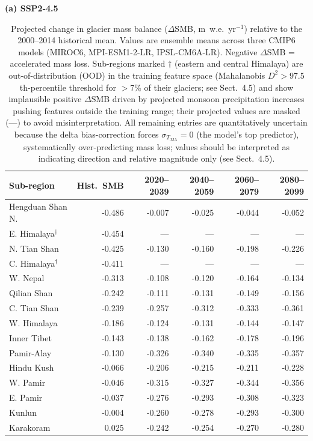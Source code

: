 \begin{table}[htbp]
\centering
\caption{Projected change in glacier mass balance ($\Delta$SMB, m~w.e.~yr$^{-1}$) relative to the 2000--2014 historical mean. Values are ensemble means across three CMIP6 models (MIROC6, MPI-ESM1-2-LR, IPSL-CM6A-LR). Negative $\Delta$SMB = accelerated mass loss. Sub-regions marked $\dagger$ (eastern and central Himalaya) are out-of-distribution (OOD) in the training feature space (Mahalanobis $D^2 > 97.5$th-percentile threshold for $>7$\% of their glaciers; see Sect.~4.5) and show implausible positive $\Delta$SMB driven by projected monsoon precipitation increases pushing features outside the training range; their projected values are masked (---) to avoid misinterpretation. All remaining entries are quantitatively uncertain because the delta bias-correction forces $\sigma_{T_\text{JJA}}=0$ (the model's top predictor), systematically over-predicting mass loss; values should be interpreted as indicating direction and relative magnitude only (see Sect.~4.5).}
\label{tab:projections}
\small
\textbf{(a) SSP2-4.5}\\[2pt]
\begin{tabular}{lrrrrr}
\hline
Sub-region & Hist.\ SMB & 2020--2039 & 2040--2059 & 2060--2079 & 2080--2099 \\
\hline
Hengduan Shan N. & -0.486 & -0.007 & -0.025 & -0.044 & -0.052 \\
E. Himalaya$^{\dagger}$ & -0.454 & --- & --- & --- & --- \\
N. Tian Shan & -0.425 & -0.130 & -0.160 & -0.198 & -0.226 \\
C. Himalaya$^{\dagger}$ & -0.411 & --- & --- & --- & --- \\
W. Nepal & -0.313 & -0.108 & -0.120 & -0.164 & -0.134 \\
Qilian Shan & -0.242 & -0.111 & -0.131 & -0.149 & -0.156 \\
C. Tian Shan & -0.239 & -0.257 & -0.312 & -0.333 & -0.361 \\
W. Himalaya & -0.186 & -0.124 & -0.131 & -0.144 & -0.147 \\
Inner Tibet & -0.143 & -0.138 & -0.162 & -0.178 & -0.196 \\
Pamir-Alay & -0.130 & -0.326 & -0.340 & -0.335 & -0.357 \\
Hindu Kush & -0.066 & -0.206 & -0.215 & -0.211 & -0.228 \\
W. Pamir & -0.046 & -0.315 & -0.327 & -0.344 & -0.356 \\
E. Pamir & -0.037 & -0.276 & -0.293 & -0.308 & -0.323 \\
Kunlun & -0.004 & -0.260 & -0.278 & -0.293 & -0.300 \\
Karakoram & 0.025 & -0.242 & -0.254 & -0.270 & -0.280 \\
\hline
\end{tabular}


\end{table}
